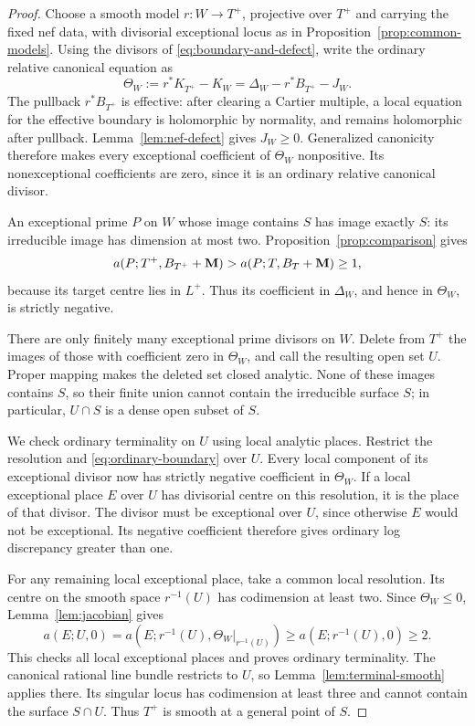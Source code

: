 \begin{proof}
Choose a smooth model $r\colon W\to T^+$, projective over $T^+$ and
carrying the fixed nef data, with divisorial exceptional locus as in
Proposition~\ref{prop:common-models}.  Using the divisors of
\eqref{eq:boundary-and-defect}, write the ordinary relative canonical
equation as
\begin{equation}
 \Theta_W:=r^*K_{T^+}-K_W
   =\Delta_W-r^*B_{T^+}-J_W.
 \label{eq:ordinary-boundary}
\end{equation}
The pullback $r^*B_{T^+}$ is effective: after clearing a Cartier
multiple, a local equation for the effective boundary is holomorphic
by normality, and remains holomorphic after pullback.
Lemma~\ref{lem:nef-defect} gives $J_W\geq0$.  Generalized canonicity
therefore makes every exceptional coefficient of $\Theta_W$
nonpositive.  Its nonexceptional coefficients are zero, since it is
an ordinary relative canonical divisor.

An exceptional prime $P$ on $W$ whose image contains $S$ has image
exactly $S$: its irreducible image has dimension at most two.
Proposition~\ref{prop:comparison} gives
\[
 a(P;T^+,B_{T^+}+\mathbf M)>a(P;T,B_T+\mathbf M)\geq1,
\]
because its target centre lies in $L^+$.  Thus its coefficient in
$\Delta_W$, and hence in $\Theta_W$, is strictly negative.

There are only finitely many exceptional prime divisors on $W$.
Delete from $T^+$ the images of those with coefficient zero in
$\Theta_W$, and call the resulting open set $U$.  Proper mapping
makes the deleted set closed analytic.  None of these images contains
$S$, so their finite union cannot contain the irreducible surface $S$;
in particular, $U\cap S$ is a dense open subset of $S$.

We check ordinary terminality on $U$ using local analytic places.
Restrict the resolution and \eqref{eq:ordinary-boundary} over $U$.
Every local component of its exceptional divisor now has strictly
negative coefficient in $\Theta_W$.  If a local exceptional place
$E$ over $U$ has divisorial centre on this resolution, it is the place
of that divisor.  The divisor must be exceptional over $U$, since
otherwise $E$ would not be exceptional.  Its negative coefficient
therefore gives ordinary log discrepancy greater than one.

For any remaining local exceptional place, take a common local
resolution.  Its centre on the smooth space $r^{-1}(U)$ has
codimension at least two.  Since $\Theta_W\leq0$,
Lemma~\ref{lem:jacobian} gives
\[
 a(E;U,0)=a(E;r^{-1}(U),\Theta_W|_{r^{-1}(U)})
       \geq a(E;r^{-1}(U),0)\geq2.
\]
This checks all local exceptional places and proves ordinary
terminality.  The canonical rational line bundle restricts to $U$,
so Lemma~\ref{lem:terminal-smooth} applies there.  Its singular locus
has codimension at least three and cannot contain the surface
$S\cap U$.  Thus $T^+$ is smooth at a general point of $S$.
\end{proof}

